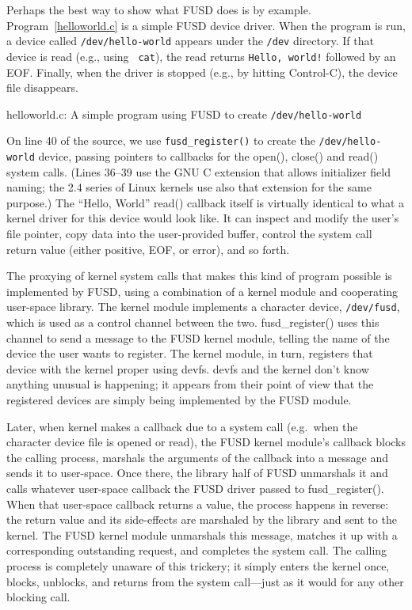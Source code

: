 \documentclass{article}
\begin{document}
Perhaps the best way to show what FUSD does is by example.
Program~\ref{helloworld.c} is a simple FUSD device driver.  When the
program is run, a device called {\tt /dev/hello-world} appears under
the {\tt /dev} directory.  If that device is read (e.g., using {\tt
cat}), the read returns {\tt Hello, world!} followed by an EOF.
Finally, when the driver is stopped (e.g., by hitting Control-C), the
device file disappears.

\begin{Program}
\caption{helloworld.c: A simple program using FUSD to
	create {\tt /dev/hello-world}}
\label{helloworld.c}
\end{Program}

On line 40 of the source, we use {\tt fusd\_register()} to create the
{\tt /dev/hello-world} device, passing pointers to callbacks for the
open(), close() and read() system calls.  (Lines 36--39 use the GNU C
extension that allows initializer field naming; the 2.4 series of
Linux kernels use also that extension for the same purpose.)  The
``Hello, World'' read() callback itself is virtually identical to what
a kernel driver for this device would look like.  It can inspect and
modify the user's file pointer, copy data into the user-provided
buffer, control the system call return value (either positive, EOF, or
error), and so forth.

The proxying of kernel system calls that makes this kind of program
possible is implemented by FUSD, using a combination of a kernel
module and cooperating user-space library.  The kernel module
implements a character device, {\tt /dev/fusd}, which is used as a
control channel between the two.  fusd\_register() uses this channel
to send a message to the FUSD kernel module, telling the name of the
device the user wants to register.  The kernel module, in turn,
registers that device with the kernel proper using devfs.  devfs and
the kernel don't know anything unusual is happening; it appears from
their point of view that the registered devices are simply being
implemented by the FUSD module.

Later, when kernel makes a callback due to a system call (e.g.\ when
the character device file is opened or read), the FUSD kernel module's
callback blocks the calling process, marshals the arguments of the
callback into a message and sends it to user-space.  Once there, the
library half of FUSD unmarshals it and calls whatever user-space
callback the FUSD driver passed to fusd\_register().  When that
user-space callback returns a value, the process happens in reverse:
the return value and its side-effects are marshaled by the library
and sent to the kernel.  The FUSD kernel module unmarshals this
message, matches it up with a corresponding outstanding request, and
completes the system call.  The calling process is completely unaware
of this trickery; it simply enters the kernel once, blocks, unblocks,
and returns from the system call---just as it would for any other
blocking call.
\end{document}
